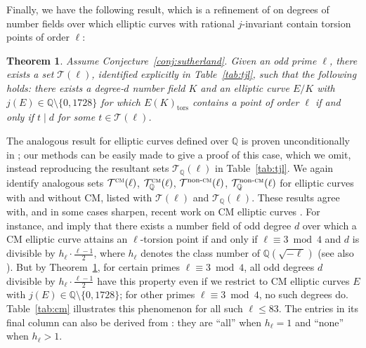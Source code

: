 \documentclass[table,dvipsnames]{amsart}
\newcommand{\Q}{\mathbb{Q}}
\newcommand{\tor}{\mathrm{tors}}
\newtheorem{theorem}{Theorem}[section]
\numberwithin{equation}{section}
\newcommand{\CM}{\textsc{cm}}
\newcommand{\nonCM}{{\textrm{non-}\textsc{cm}}}
\begin{document}
Finally, we have the following result, which is a refinement of \cite[Thm.~1.7]{lozanorobledo2013} on degrees of number fields over which elliptic curves with rational $j$-invariant contain torsion points of order $\ell$:
\begin{theorem}
\label{thm:3}
Assume Conjecture~\ref{conj:sutherland}. Given an odd prime $\ell$, there exists a set $\mathcal{T}(\ell)$, identified explicitly in Table~\ref{tab:tjl}, such that the following holds: there exists a degree-$d$ number field $K$ and an elliptic curve $E/K$ with $j(E)\in\Q\setminus\{0,1728\}$ for which $E(K)_\tor$ contains a point of order $\ell$ if and only if $t\mid d$ for some $t\in\mathcal{T}(\ell)$.
\end{theorem}
The analogous result for elliptic curves defined over $\Q$ is proven unconditionally in \cite[Cor.~6.1]{gonzalezjimenez2016c}; our methods can be easily made to give a proof of this case, which we omit, instead reproducing the resultant sets $\mathcal{T}_\Q(\ell)$ in Table~\ref{tab:tjl}. We again identify analogous sets $\mathcal{T}^\CM(\ell)$, $\mathcal{T}_\Q^\CM(\ell)$, $\mathcal{T}^\nonCM(\ell)$, $\mathcal{T}_\Q^\nonCM(\ell)$ for elliptic curves with and without CM, listed with $\mathcal{T}(\ell)$ and $\mathcal{T}_\Q(\ell)$. These results agree with, and in some cases sharpen, recent work on CM elliptic curves \cite{bourdonclarkstankewicz,bourdonpollack,bourdonclark}. For instance, \cite[Thm.~1.5]{bourdonclarkstankewicz} and \cite[Thm.~1.2]{bourdonpollack} imply that there exists a number field of odd degree $d$ over which a CM elliptic curve attains an $\ell$-torsion point if and only if $\ell\equiv 3\bmod 4$ and $d$ is divisible by $h_\ell\cdot\frac{\ell-1}{2}$, where $h_\ell$ denotes the class number of $\Q(\sqrt{-\ell})$ (see also \cite[Thm.~6.2]{bourdonclark}). But by Theorem~\ref{thm:3}, for certain primes $\ell\equiv 3\bmod 4$, all odd degrees $d$ divisible by $h_\ell\cdot\frac{\ell-1}{2}$ have this property even if we restrict to CM elliptic curves $E$ with $j(E)\in\Q\setminus\{0,1728\}$; for other primes $\ell\equiv 3\bmod 4$, no such degrees do. Table~\ref{tab:cm} illustrates this phenomenon for all such $\ell\le 83$. The entries in its final column can also be derived from \cite{bourdonclarkstankewicz,bourdonpollack}: they are ``all'' when $h_\ell=1$ and ``none'' when $h_\ell>1$.
\end{document}
